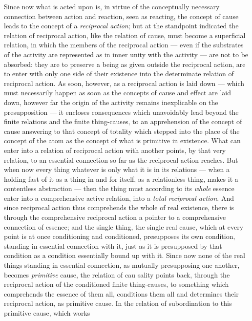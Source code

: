 \documentclass[12pt,a4paper]{book}
\begin{document}
Since now what is acted upon is, in virtue of the conceptually necessary
connection between action and reaction, seen as reacting, the concept of cause
leads to the concept of a \emph{reciprocal action}; but at the standpoint
indicated the relation of reciprocal action, like the relation of cause, must
become a superficial relation, in which the members of the reciprocal action
--- even if the substrates of the activity are represented as in inner unity
with the activity --- are not to be absorbed: they are to preserve a being as
given outside the reciprocal action, are to enter with only one side of their
existence into the determinate relation of reciprocal action. As soon,
however, as a reciprocal action is laid down --- which must necessarily happen
as soon as the concepts of cause and effect are laid down, however far the
origin of the activity remains inexplicable on the presupposition --- it
encloses consequences which unavoidably lead beyond the finite relations and
the finite thing-causes, to an apprehension of the concept of cause answering
to that concept of totality which stepped into the place of the concept of the
atom as the concept of what is primitive in existence. What can enter into a
relation of reciprocal action with another points, by that very relation, to
an essential connection so far as the reciprocal action reaches. But when now
every thing whatever is only what it is in its relations --- when a holding
fast of it as a thing in and for itself, as a relationless thing, makes it a
contentless abstraction --- then the thing must according to its \emph{whole}
essence enter into a comprehensive active relation, into a \emph{total
reciprocal action}. And since reciprocal action thus comprehends the whole of
real existence, there is through the comprehensive reciprocal action a pointer
to a comprehensive connection of essence; and the single thing, the single
real cause, which at every point is at once conditioning and conditioned,
presupposes its own condition, standing in essential connection with it, just
as it is presupposed by that condition as a condition essentially bound up
with it. Since now none of the real things standing in essential connection,
as mutually presupposing one another, becomes \emph{primitive} cause, the
relation of cau\-%
sality points back, through the reciprocal action of the conditioned finite
thing-causes, to something which comprehends the essence of them all,
conditions them all and determines their reciprocal action, as primitive
cause. In the relation of subordination to this primitive cause, which works
\end{document}

